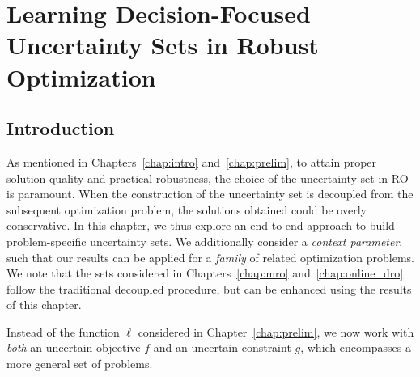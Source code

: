 \chapter{Learning Decision-Focused Uncertainty Sets in Robust Optimization}
\label{chap:lro}

\glsresetall

\section{Introduction}
\label{sec:intro_p}
As mentioned in Chapters~\ref{chap:intro} and~\ref{chap:prelim}, to attain proper solution quality and practical robustness, the choice of the uncertainty set in \gls{RO} is paramount. 
When the construction of the uncertainty set is decoupled from the subsequent optimization problem, the solutions obtained could be overly conservative. 
In this chapter, we thus explore an end-to-end approach to build problem-specific uncertainty sets. We additionally consider a {\it context parameter}, such that our results can be applied for a {\it family} of related optimization problems. We note that the sets considered in Chapters~\ref{chap:mro} and~\ref{chap:online_dro} follow the traditional decoupled procedure, but can be enhanced using the results of this chapter. 

Instead of the function $\ell$ considered in Chapter~\ref{chap:prelim}, we now work with {\it both} an uncertain objective $f$ and an uncertain constraint $g$, which encompasses a more general set of problems. 


